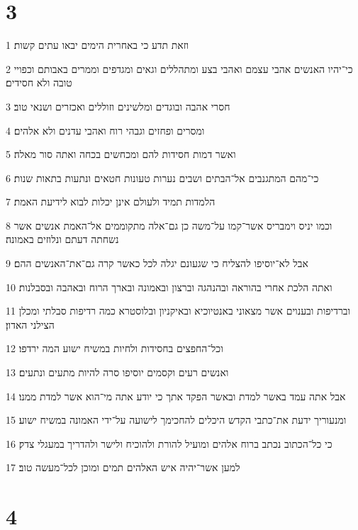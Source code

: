 \chapter{3}

\par 1 וזאת תדע כי באחרית הימים יבאו עתים קשות׃
\par 2 כי־יהיו האנשים אהבי עצמם ואהבי בצע ומתהללים וגאים ומגדפים וממרים באבותם וכפויי טובה ולא חסידים׃
\par 3 חסרי אהבה ובוגדים ומלשינים וזוללים ואכזרים ושנאי טוב׃
\par 4 ומסרים ופחזים וגבהי רוח ואהבי עדנים ולא אלהים׃
\par 5 ואשר דמות חסידות להם ומכחשים בכחה ואתה סור מאלה׃
\par 6 כי־מהם המתגנבים אל־הבתים ושבים נערות טעונות חטאים ונתעות בתאות שנות׃
\par 7 הלמדות תמיד ולעולם אינן יכלות לבוא לידיעת האמת׃
\par 8 וכמו יניס וימבריס אשר־קמו על־משה כן גם־אלה מתקוממים אל־האמת אנשים אשר נשחתה דעתם ונלוזים באמונה׃
\par 9 אבל לא־יוסיפו להצליח כי שגעונם יגלה לכל כאשר קרה גם־את־האנשים ההם׃
\par 10 ואתה הלכת אחרי בהוראה ובהנהגה וברצון ובאמונה ובארך הרוח ובאהבה ובסבלנות׃
\par 11 וברדיפות ובענוים אשר מצאוני באנטיוכיא ובאיקניון ובלוסטרא כמה רדיפות סבלתי ומכלן הצילני האדון׃
\par 12 וכל־החפצים בחסידות ולחיות במשיח ישוע המה ירדפו׃
\par 13 ואנשים רעים וקסמים יוסיפו סרה להיות מתעים ונתעים׃
\par 14 אבל אתה עמד באשר למדת ובאשר הפקד אתך כי יודע אתה מי־הוא אשר למדת ממנו׃
\par 15 ומנעוריך ידעת את־כתבי הקדש היכלים להחכימך לישועה על־ידי האמונה במשיח ישוע׃
\par 16 כי כל־הכתוב נכתב ברוח אלהים ומועיל להורת ולהוכיח ולישר ולהדריך במעגלי צדק׃
\par 17 למען אשר־יהיה איש האלהים תמים ומוכן לכל־מעשה טוב׃

\chapter{4}

